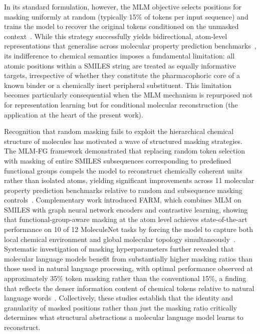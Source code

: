 \documentclass[a4paper,12pt]{article}
\begin{document}
In its standard formulation, however, the MLM objective selects positions for
masking uniformly at random (typically 15\% of tokens per input sequence) 
and trains the model to recover the original tokens conditioned on the unmasked
context~\cite{Devlin2018, chithrananda2020chemberta}. While this strategy successfully yields 
bidirectional, atom-level representations that generalise across molecular property 
prediction benchmarks~\cite{chithrananda2020chemberta, Ross2022}, its indifference 
to chemical semantics imposes a fundamental limitation: all atomic positions within a 
SMILES string are treated as equally informative targets, irrespective of whether they 
constitute the pharmacophoric core of a known binder or a chemically inert peripheral 
substituent. This limitation becomes particularly consequential when the MLM mechanism 
is repurposed not for representation learning but for conditional molecular 
reconstruction (the application at the heart of the present work).


Recognition that random masking fails to exploit the hierarchical chemical structure of 
molecules has motivated a wave of structured masking strategies. The MLM-FG framework 
demonstrated that replacing random token selection with masking of entire SMILES 
subsequences corresponding to predefined functional groups compels the model to 
reconstruct chemically coherent units rather than isolated atoms, yielding significant 
improvements across 11 molecular property prediction benchmarks relative to random and 
subsequence masking controls~\cite{peng2025mlmfg}. Complementary work introduced FARM, 
which combines MLM on SMILES with graph neural network encoders and contrastive 
learning, showing that functional-group-aware masking at the atom level achieves 
state-of-the-art performance on 10 of 12 MoleculeNet tasks by forcing the model to 
capture both local chemical environment and global molecular topology 
simultaneously~\cite{nguyen2024farm}. Systematic investigation of masking 
hyperparameters further revealed that molecular language models benefit from 
substantially higher masking ratios than those used in natural language processing, 
with optimal performance observed at approximately 35\% token masking rather than the 
conventional 15\%, a finding that reflects the denser information content of chemical 
tokens relative to natural language words~\cite{kruger2025molencoder}. Collectively, 
these studies establish that the identity and granularity of masked positions rather 
than just the masking ratio critically determines what structural abstractions a 
molecular language model learns to reconstruct.
\end{document}
